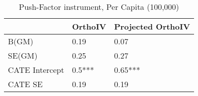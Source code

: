 \begin{table}\centering\caption{Push-Factor instrument, Per Capita (100,000)}\begin{tabular}{lll}
\toprule
                & OrthoIV   & Projected OrthoIV   \\
\midrule
 B(GM)          & 0.19      & 0.07                \\
 SE(GM)         & 0.25      & 0.27                \\
 CATE Intercept & 0.5***    & 0.65***             \\
 CATE SE        & 0.19      & 0.19                \\
\bottomrule
\end{tabular}\end{table}